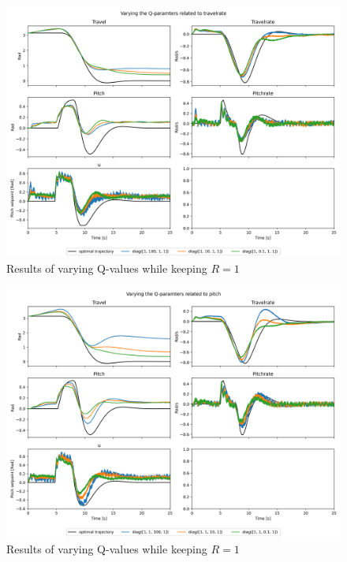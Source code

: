 \documentclass[../main.tex]{subfiles}
\begin{document}
\begin{figure}[h]
	\includegraphics[width=\linewidth]{figures/LAB3_Q_variations_travelrate.png}
	\caption{Results of varying Q-values while keeping $R=1$}
	\label{fig:LAB3_Q_variations_travelrate}
\end{figure}

\begin{figure}[h]
	\includegraphics[width=\linewidth]{figures/LAB3_Q_variations_pitch.png}
	\caption{Results of varying Q-values while keeping $R=1$}
	\label{fig:LAB3_Q_variations_pitch}
\end{figure}
\end{document}
